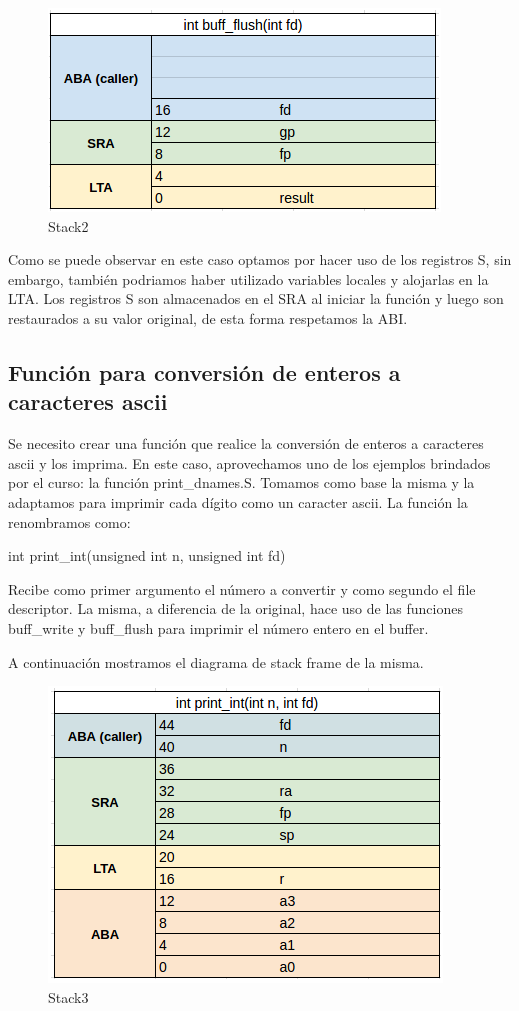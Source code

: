 \documentclass{article}
\begin{document}
\begin{figure}[H]
	\centering
		\includegraphics[scale=0.4]{stack2.png}
	\caption{Stack2}
	\label{fig:stack2}
\end{figure}

Como se puede observar en este caso optamos por hacer uso de los registros S, sin embargo, también podriamos haber utilizado variables locales y alojarlas en la LTA. Los registros S son almacenados en el SRA al iniciar la función y luego son restaurados a su valor original, de esta forma respetamos la ABI.

\subsection{Función para conversión de enteros a caracteres ascii}

Se necesito crear una función que realice la conversión de enteros a caracteres ascii y los imprima. En este caso, aprovechamos uno de los ejemplos brindados por el curso: la función print\_dnames.S. Tomamos como base la misma y la adaptamos para imprimir cada dígito como un caracter ascii.
La función la renombramos como:

int print\_int(unsigned int n, unsigned int fd)

Recibe como primer argumento el número a convertir y como segundo el file descriptor. La misma, a diferencia de la original, hace uso de las funciones buff\_write y buff\_flush para imprimir el número entero en el buffer.

A continuación mostramos el diagrama de stack frame de la misma.

\begin{figure}[H]
	\centering
		\includegraphics[scale=0.4]{stack3.png}
	\caption{Stack3}
	\label{fig:stack3}
\end{figure}
\end{document}

